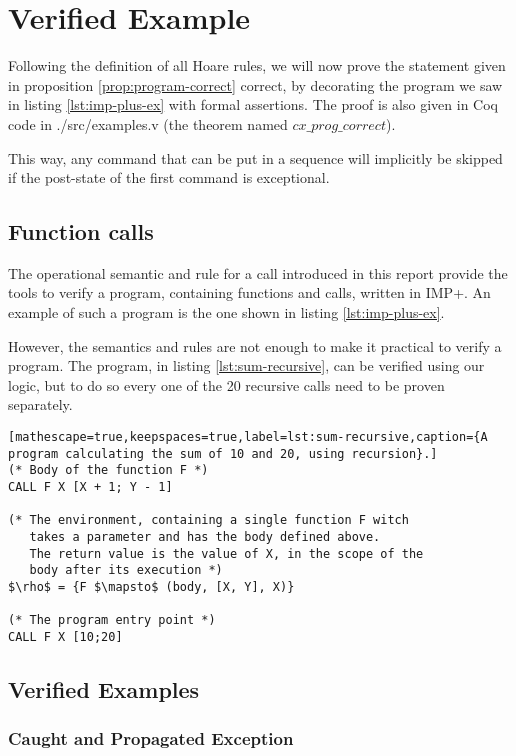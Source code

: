 \section{Verified Example}

Following the definition of all Hoare rules, we will now prove the statement given in proposition \ref{prop:program-correct} correct, by decorating the program we saw in listing \ref{lst:imp-plus-ex} with formal assertions. The proof is also given in Coq code in ./src/examples.v (the theorem named $cx\_prog\_correct$).

This way, any command that can be put in a sequence will implicitly be skipped if the post-state of the first command is exceptional.

\subsection{Function calls}
The operational semantic and rule for a call introduced in this report provide the tools to verify a program, containing functions and calls, written in IMP+. An example of such a program is the one shown in listing \ref{lst:imp-plus-ex}.

However, the semantics and rules are not enough to make it practical to verify a program. The program, in listing \ref{lst:sum-recursive}, can be verified using our logic, but to do so every one of the 20 recursive calls need to be proven separately.

\begin{lstlisting}[mathescape=true,keepspaces=true,label=lst:sum-recursive,caption={A program calculating the sum of 10 and 20, using recursion}.]
(* Body of the function F *)
CALL F X [X + 1; Y - 1]

(* The environment, containing a single function F witch
   takes a parameter and has the body defined above.
   The return value is the value of X, in the scope of the 
   body after its execution *)
$\rho$ = {F $\mapsto$ (body, [X, Y], X)}

(* The program entry point *)
CALL F X [10;20]
\end{lstlisting}

\subsection{Verified Examples}

\subsubsection{Caught and Propagated Exception}

